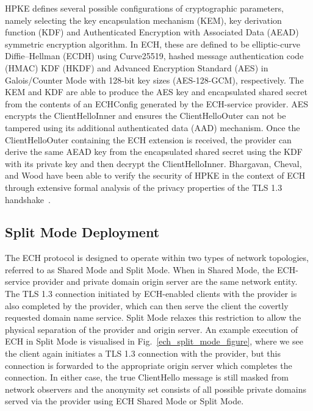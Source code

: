 HPKE defines several possible configurations of cryptographic parameters, namely selecting the key encapsulation mechanism (KEM), key derivation function (KDF) and Authenticated Encryption with Associated Data (AEAD) symmetric encryption algorithm. In ECH, these are defined to be elliptic-curve Diffie–Hellman (ECDH) using Curve25519, hashed message authentication code (HMAC) KDF (HKDF) and Advanced Encryption Standard (AES) in Galois/Counter Mode with 128-bit key sizes (AES-128-GCM), respectively. The KEM and KDF are able to produce the AES key and encapsulated shared secret from the contents of an ECHConfig generated by the ECH-service provider. AES encrypts the ClientHelloInner and ensures the ClientHelloOuter can not be tampered using its additional authenticated data (AAD) mechanism. Once the ClientHelloOuter containing the ECH extension is received, the provider can derive the same AEAD key from the encapsulated shared secret using the KDF with its private key and then decrypt the ClientHelloInner. Bhargavan, Cheval, and Wood have been able to verify the security of HPKE in the context of ECH through extensive formal analysis of the privacy properties of the TLS 1.3 handshake~\cite{bhargavan2022symbolic}.

\subsection{Split Mode Deployment}

The ECH protocol is designed to operate within two types of network topologies, referred to as Shared Mode and Split Mode. When in Shared Mode, the ECH-service provider and private domain origin server are the same network entity. The TLS 1.3 connection initiated by ECH-enabled clients with the provider is also completed by the provider, which can then serve the client the covertly requested domain name service. Split Mode relaxes this restriction to allow the physical separation of the provider and origin server. An example execution of ECH in Split Mode is visualised in Fig.~\ref{ech_split_mode_figure}, where we see the client again initiates a TLS 1.3 connection with the provider, but this connection is forwarded to the appropriate origin server which completes the connection. In either case, the true ClientHello message is still masked from network observers and the anonymity set consists of all possible private domains served via the provider using ECH Shared Mode or Split Mode.

